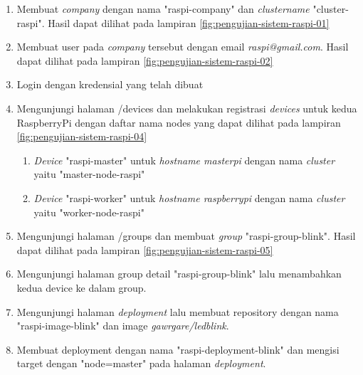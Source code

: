 \begin{enumerate}
    \item Membuat \textit{company} dengan nama "raspi-company" dan \textit{cluster\textunderscore name} "cluster-raspi". Hasil dapat dilihat pada lampiran \ref{fig:pengujian-sistem-raspi-01}
    \item Membuat user pada \textit{company} tersebut dengan email \textit{raspi@gmail.com}. Hasil dapat dilihat pada lampiran \ref{fig:pengujian-sistem-raspi-02}
    \item Login dengan kredensial yang telah dibuat
    \item Mengunjungi halaman /devices dan melakukan registrasi \textit{devices} untuk kedua RaspberryPi dengan daftar nama nodes yang dapat dilihat pada lampiran \ref{fig:pengujian-sistem-raspi-04}
          \begin{enumerate}
              \item \textit{Device} "raspi-master" untuk \textit{hostname masterpi} dengan nama \textit{cluster} yaitu "master-node-raspi"
              \item  \textit{Device} "raspi-worker" untuk \textit{hostname raspberrypi} dengan nama \textit{cluster} yaitu "worker-node-raspi"
          \end{enumerate}
    \item Mengunjungi halaman /groups dan membuat \textit{group} "raspi-group-blink". Hasil dapat dilihat pada lampiran \ref{fig:pengujian-sistem-raspi-05}
    \item Mengunjungi halaman group detail "raspi-group-blink" lalu menambahkan kedua device ke dalam group.
    \item Mengunjungi halaman \textit{deployment} lalu membuat repository dengan nama "raspi-image-blink" dan image\textit{ gawrgare/led\textunderscore blink}.
    \item Membuat deployment dengan nama "raspi-deployment-blink" dan mengisi target dengan "node=master" pada halaman \textit{deployment}.
\end{enumerate}

